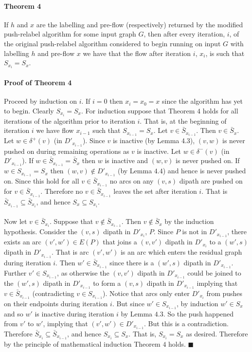 \documentclass[letterpaper,12pt,oneside,onecolumn]{article}
\begin{document}
\paragraph{Theorem 4}
If $h$ and $x$ are the labelling and pre-flow (respectively) returned by the modified push-relabel algorithm for some input graph $G$, then after every iteration, $i$, of the original push-relabel algorithm considered to begin running on input $G$ with labelling $h$ and pre-flow $x$ we have that the flow after iteration $i$, $x_i$, is such that $S_{x_i} = S_x$.
\paragraph{Proof of Theorem 4}
Proceed by induction on $i$. If $i = 0$ then $x_i = x_0 = x$ since the algorithm has yet to begin. Clearly $S_{x_i} = S_x$. For induction suppose that Theorem $4$ holds for all iterations of the algorithm prior to iteration $i$. That is, at the beginning of iteration $i$ we have flow $x_{i-1}$ such that $S_{x_{i-1}} = S_x$. Let $v \in \bar{S}_{x_{i-1}}$. Then $v \in \bar{S}_x$. Let $w \in \delta^+(v)$ (in $D'_{x_{i-1}}$). Since $v$ is inactive (by Lemma 4.3), $(v,w)$ is never pushed on during remaining operations as $v$ is inactive. Let $w \in \delta^-(v)$ (in $D'_{x_{i-1}}$). If $w \in \bar{S}_{x_{i-1}} = \bar{S}_x$ then $w$ is inactive and $(w,v)$ is never pushed on. If $w \in S_{x_{i-1}} = S_x$ then $(w,v) \not\in D'_{x_{i-1}}$ (by Lemma $4.4$) and hence is never pushed on. Since this hold for all $v \in \bar{S}_{x_{i-1}}$ no arcs on any $(v,s)$ dipath are pushed on for $v \in \bar{S}_{x_{i-1}}$. Therefore no $v \in \bar{S}_{x_{i-1}}$ leaves the set after iteration $i$. That is $\bar{S}_{x_{i-1}} \subseteq \bar{S}_{x_i}$, and hence $S_x \subseteq S_{x_i}$.
\paragraph{}
Now let $v \in \bar{S}_{x_i}$. Suppose that $v \not\in \bar{S}_{x_{i-1}}$. Then $v \not \in \bar{S}_x$ by the induction hypothesis. Consider the $(v,s)$ dipath in $D'_{x_i}$, $P$. Since $P$ is not in $D'_{x_{i-1}}$, there exists an arc $(v',w') \in E(P)$ that joins a $(v,v')$ dipath in $D'_{x_{i}}$ to a $(w',s)$ dipath in $D'_{x_{i-1}}$. That is arc $(v',w')$ is an arc which enters the residual graph during iteration $i$. Then $w' \in \bar{S}_{x_{i-1}}$ since there is a $(w',s)$ dipath in $D'_{x_{i-1}}$. Further $v' \in S_{x_{i-1}}$, as otherwise the $(v,v')$ dipath in $D'_{x_{i-1}}$ could be joined to the $(w',s)$ dipath in $D'_{x_{i-1}}$ to form a $(v,s)$ dipath in $D'_{x_{i-1}}$ implying that $v \in \bar{S}_{x_{i-1}}$ (contradicting $v \in S_{x_{i-1}}$). Notice that arcs only enter $D'_{x_i}$ from pushes on their endpoints during iteration $i$. But since $w' \in S_{x_{i-1}}$, by induction $w' \in S_{x}$ and so $w'$ is inactive during iteration $i$ by Lemma $4.3$. So the push happened from $v'$ to $w'$, implying that $(v',w') \in D'_{x_{i-1}}$. But this is a contradiction. Therefore $\bar{S}_{x_i} \subseteq \bar{S}_{x_{i-1}}$, and hence $S_{x_i} \subseteq S_x$. That is, $S_{x_i} = S_x$ as desired. Therefore by the principle of mathematical induction Theorem $4$ holds. $\blacksquare$
\end{document}
